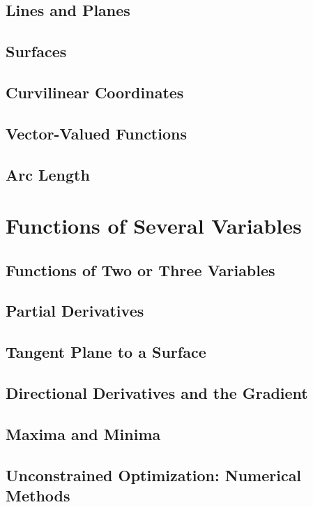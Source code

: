 \documentclass[symmetric,justified,marginals=justified,notoc]{tufte-book}
\theoremstyle{mytheoremstyle}
\begin{document}
	\section{Lines and Planes}
	
	\section{Surfaces}
	
	\section{Curvilinear Coordinates}
	
	\section{Vector-Valued Functions}
	
	\section{Arc Length}

\chapter{Functions of Several Variables}

	\section{Functions of Two or Three Variables}
	
	\section{Partial Derivatives}
	
	\section{Tangent Plane to a Surface}
	
	\section{Directional Derivatives and the Gradient}
	
	\section{Maxima and Minima}
	
	\section{Unconstrained Optimization: Numerical Methods}
	
\end{document}
